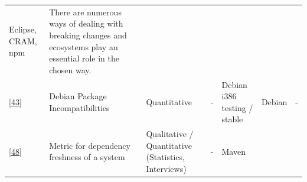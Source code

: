 \documentclass[]{book}
\begin{document}
\begin{longtable}[]{@{}lllllll@{}}
\begin{minipage}[t]{0.12\columnwidth}
Eclipse, CRAM, npm\strut
\end{minipage} & \begin{minipage}[t]{0.10\columnwidth}\raggedright\strut
There are numerous ways of dealing with breaking changes and ecosystems
play an essential role in the chosen way.\strut
\end{minipage}\tabularnewline
\begin{minipage}[t]{0.09\columnwidth}\raggedright\strut
{[}\protect\hyperlink{ref-Claes2015}{43}{]}\strut
\end{minipage} & \begin{minipage}[t]{0.16\columnwidth}\raggedright\strut
Debian Package Incompatibilities\strut
\end{minipage} & \begin{minipage}[t]{0.17\columnwidth}\raggedright\strut
Quantitative\strut
\end{minipage} & \begin{minipage}[t]{0.07\columnwidth}\raggedright\strut
-\strut
\end{minipage} & \begin{minipage}[t]{0.10\columnwidth}\raggedright\strut
Debian i386 testing / stable\strut
\end{minipage} & \begin{minipage}[t]{0.12\columnwidth}\raggedright\strut
Debian\strut
\end{minipage} & \begin{minipage}[t]{0.10\columnwidth}\raggedright\strut
-\strut
\end{minipage}\tabularnewline
\begin{minipage}[t]{0.09\columnwidth}\raggedright\strut
{[}\protect\hyperlink{ref-Cox2015}{48}{]}\strut
\end{minipage} & \begin{minipage}[t]{0.16\columnwidth}\raggedright\strut
Metric for dependency freshness of a system\strut
\end{minipage} & \begin{minipage}[t]{0.17\columnwidth}\raggedright\strut
Qualitative / Quantitative (Statistics, Interviews)\strut
\end{minipage} & \begin{minipage}[t]{0.07\columnwidth}\raggedright\strut
-\strut
\end{minipage} & \begin{minipage}[t]{0.10\columnwidth}\raggedright\strut
Maven\strut
\end{minipage} & \begin{minipage}[t]{0.12\columnwidth}\raggedright\strut

\end{minipage}
\end{longtable}
\end{document}
